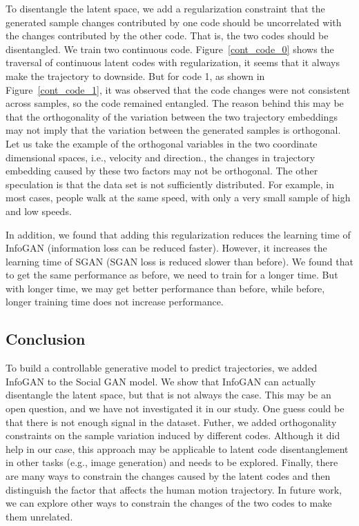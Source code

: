 To disentangle the latent space, we add a regularization constraint that the generated sample changes contributed by one code should be uncorrelated with the changes contributed by the other code. That is, the two codes should be disentangled. We train two continuous code. Figure~\ref{cont_code_0} shows the traversal of continuous latent codes with regularization, it seems that it always make the trajectory to downside. But for code 1, as shown in Figure~\ref{cont_code_1}, it was observed that the code changes were not consistent across samples, so the code remained entangled. The reason behind this may be that the orthogonality of the variation between the two trajectory embeddings may not imply that the variation between the generated samples is orthogonal. Let us take the example of the orthogonal variables in the two coordinate dimensional spaces, i.e., velocity and direction., the changes in trajectory embedding caused by these two factors may not be orthogonal. The other speculation is that the data set is not sufficiently distributed. For example, in most cases, people walk at the same speed, with only a very small sample of high and low speeds.

In addition, we found that adding this regularization reduces the learning time of InfoGAN (information loss can be reduced faster). However, it increases the learning time of SGAN (SGAN loss is reduced slower than before). We found that to get the same performance as before, we need to train for a longer time. But with longer time, we may get better performance than before, while before, longer training time does not increase performance.

\subsection{Conclusion}
To build a controllable generative model to predict trajectories, we added InfoGAN to the Social GAN model. We show that InfoGAN can actually disentangle the latent space, but that is not always the case. This may be an open question, and we have not investigated it in our study. One guess could be that there is not enough signal in the dataset. Futher, we added orthogonality constraints on the sample variation induced by different codes. Although it did help in our case, this approach may be applicable to latent code disentanglement in other tasks (e.g., image generation) and needs to be explored. Finally, there are many ways to constrain the changes caused by the latent codes and then distinguish the factor that affects the human motion trajectory. In future work, we can explore other ways to constrain the changes of the two codes to make them unrelated.